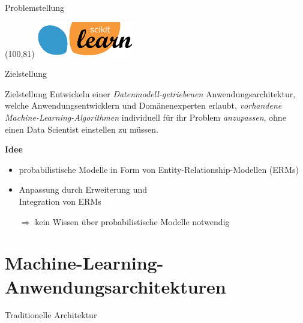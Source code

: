 \documentclass{beamer}
\newcommand{\adjustTikzSize}[0]{\Large}
\newcommand{\tikzScale}[0]{0.55}
\begin{document}
\begin{frame}[t]{Problemstellung}
{\begin{textblock}{22}(100,81)
	\includegraphics[width=1\linewidth]{scikit}
\end{textblock}
}
\end{frame}

\begin{frame}{Zielstellung}
\begin{block}{Zielstellung}\justifying
	Entwickeln einer \emph{Datenmodell-getriebenen} Anwendungsarchitektur, welche Anwendungsentwicklern und Domänenexperten erlaubt, \emph{vorhandene Machine-Learning-Algorithmen} individuell für ihr Problem \emph{anzupassen}, ohne einen Data Scientist einstellen zu müssen.
\end{block}\pause

\textbf{Idee}
\begin{itemize}
\item probabilistische Modelle in Form von Entity-Relationship-Modellen (ERMs)
\item Anpassung durch Erweiterung und\\ Integration von ERMs
\item[$\Rightarrow$] kein Wissen über probabilistische Modelle notwendig
\end{itemize}

\only<2>{
\begin{textblock}{30}(85,52)
	\scalebox{0.25}{\adjustTikzSize }
\end{textblock}
}
\end{frame}

\section{Machine-Learning-Anwendungsarchitekturen}
\begin{frame}{Traditionelle Architektur}
\scalebox{\tikzScale}{\adjustTikzSize }
\end{frame}
\end{document}
